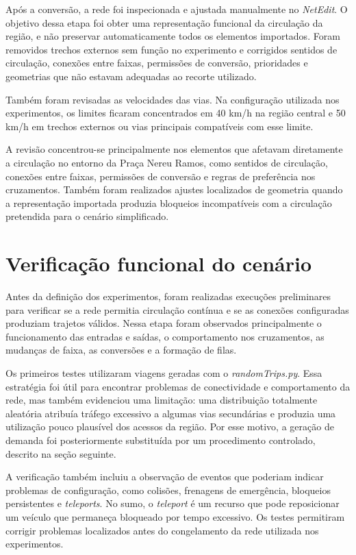 Após a conversão, a rede foi inspecionada e ajustada manualmente no \textit{NetEdit}. O objetivo dessa etapa foi obter uma representação funcional da circulação da região, e não preservar automaticamente todos os elementos importados. Foram removidos trechos externos sem função no experimento e corrigidos sentidos de circulação, conexões entre faixas, permissões de conversão, prioridades e geometrias que não estavam adequadas ao recorte utilizado.

Também foram revisadas as velocidades das vias. Na configuração utilizada nos experimentos, os limites ficaram concentrados em 40 km/h na região central e 50 km/h em trechos externos ou vias principais compatíveis com esse limite.

A revisão concentrou-se principalmente nos elementos que afetavam diretamente a circulação no entorno da Praça Nereu Ramos, como sentidos de circulação, conexões entre faixas, permissões de conversão e regras de preferência nos cruzamentos. Também foram realizados ajustes localizados de geometria quando a representação importada produzia bloqueios incompatíveis com a circulação pretendida para o cenário simplificado.

\section{Verificação funcional do cenário}

Antes da definição dos experimentos, foram realizadas execuções preliminares para verificar se a rede permitia circulação contínua e se as conexões configuradas produziam trajetos válidos. Nessa etapa foram observados principalmente o funcionamento das entradas e saídas, o comportamento nos cruzamentos, as mudanças de faixa, as conversões e a formação de filas.

Os primeiros testes utilizaram viagens geradas com o \textit{randomTrips.py}. Essa estratégia foi útil para encontrar problemas de conectividade e comportamento da rede, mas também evidenciou uma limitação: uma distribuição totalmente aleatória atribuía tráfego excessivo a algumas vias secundárias e produzia uma utilização pouco plausível dos acessos da região. Por esse motivo, a geração de demanda foi posteriormente substituída por um procedimento controlado, descrito na seção seguinte.

A verificação também incluiu a observação de eventos que poderiam indicar problemas de configuração, como colisões, frenagens de emergência, bloqueios persistentes e \textit{teleports}. No \gls{sumo}, o \textit{teleport} é um recurso que pode reposicionar um veículo que permaneça bloqueado por tempo excessivo. Os testes permitiram corrigir problemas localizados antes do congelamento da rede utilizada nos experimentos.

